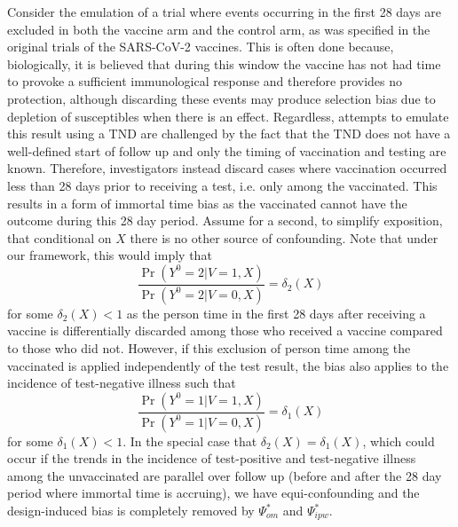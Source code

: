 \begin{appendix}
\begin{refsection}
    Consider the emulation of a trial where events occurring in the first 28 days are excluded in both the vaccine arm and the control arm, as was specified in the original trials of the SARS-CoV-2 vaccines. This is often done because, biologically, it is believed that during this window the vaccine has not had time to provoke a sufficient immunological response and therefore provides no protection, although discarding these events may produce selection bias due to depletion of susceptibles when there is an effect. Regardless, attempts to emulate this result using a TND are challenged by the fact that the TND does not have a well-defined start of follow up and only the timing of vaccination and testing are known. Therefore, investigators instead discard cases where vaccination occurred less than 28 days prior to receiving a test, i.e. only among the vaccinated. This results in a form of immortal time bias as the vaccinated cannot have the outcome during this 28 day period. Assume for a second, to simplify exposition, that conditional on $X$ there is no other source of confounding. Note that under our framework, this would imply that 
    \begin{equation*}
         \frac{\Pr(Y^0 = 2 | V = 1, X)}{\Pr(Y^0 = 2 | V = 0, X)} = \delta_2(X)
    \end{equation*}
    for some $\delta_2(X) < 1$ as the person time in the first 28 days after receiving a vaccine is differentially discarded among those who received a vaccine compared to those who did not. However, if this exclusion of person time among the vaccinated is applied independently of the test result,  the bias also applies to the incidence of test-negative illness such that
    \begin{equation*}
         \frac{\Pr(Y^0 = 1 | V = 1, X)}{\Pr(Y^0 = 1 | V = 0, X)} = \delta_1(X)
    \end{equation*}
    for some $\delta_1(X) < 1$. In the special case that $\delta_2(X) = \delta_1(X)$, which could occur if the trends in the incidence of test-positive and test-negative illness among the unvaccinated are parallel over follow up (before and after the 28 day period where immortal time is accruing), we have equi-confounding and the design-induced bias is completely removed by $\Psi^*_{om}$ and $\Psi^*_{ipw}$.
    


\end{refsection}
\end{appendix}
